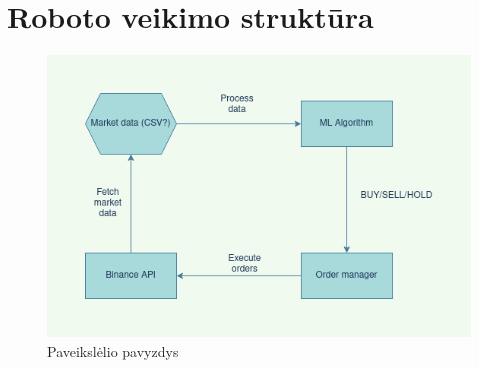 \documentclass{VUMIFInfKursinis}
\begin{document}
\printbibliography[heading=bibintoc] %

\appendix  %

\section{Roboto veikimo struktūra}
\begin{figure}[H]
  \centering
  \includegraphics[scale=0.5]{img/DIAGRAM}
  \caption{Paveikslėlio pavyzdys}   %
  \label{img:diagram}
\end{figure}
\end{document}
